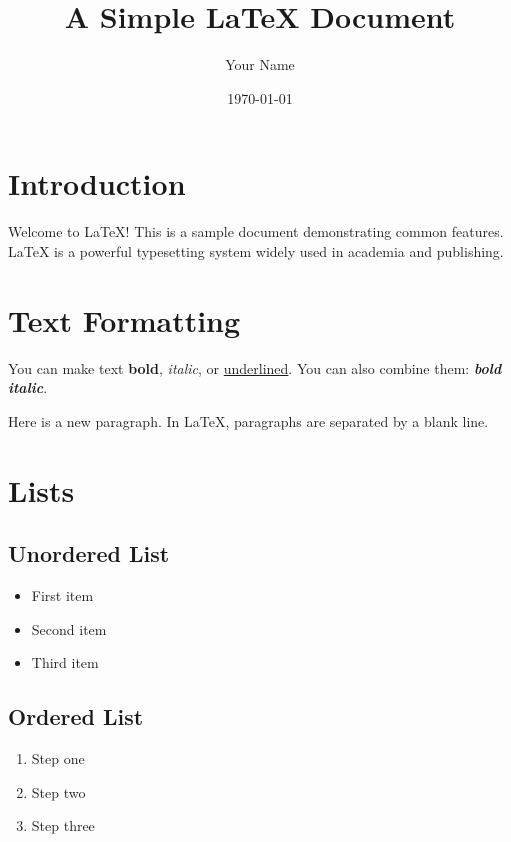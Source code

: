\documentclass[12pt]{article}
\title{A Simple \LaTeX{} Document}
\author{Your Name}
\date{\today}
\begin{document}
\maketitle

\tableofcontents
\newpage

\section{Introduction}

Welcome to \LaTeX{}! This is a sample document demonstrating common features.
\LaTeX{} is a powerful typesetting system widely used in academia and publishing.

\section{Text Formatting}

You can make text \textbf{bold}, \textit{italic}, or \underline{underlined}.
You can also combine them: \textbf{\textit{bold italic}}.

Here is a new paragraph. In \LaTeX{}, paragraphs are separated by a blank line.

\section{Lists}

\subsection{Unordered List}
\begin{itemize}
  \item First item
  \item Second item
  \item Third item
\end{itemize}

\subsection{Ordered List}
\begin{enumerate}
  \item Step one
  \item Step two
  \item Step three
\end{enumerate}
\end{document}
